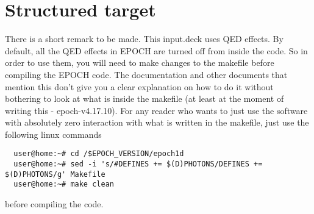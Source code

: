 \documentclass[12pt, class=report, crop=false]{standalone}
\begin{document}
\section*{Structured target}
There is a short remark to be made. This input.deck uses QED effects. By default, all the QED effects in EPOCH are turned off from inside the code. So in order to use them, you will need to make changes to the makefile before compiling the EPOCH code. The documentation and other documents that mention this don't give you a clear explanation on how to do it without bothering to look at what is inside the makefile (at least at the moment of writing this - epoch-v4.17.10). For any reader who wants to just use the software with absolutely zero interaction with what is written in the makefile, just use the following linux commands
\begin{verbatim}
  user@home:~# cd /$EPOCH_VERSION/epoch1d
  user@home:~# sed -i 's/#DEFINES += $(D)PHOTONS/DEFINES += $(D)PHOTONS/g' Makefile
  user@home:~# make clean
\end{verbatim}
before compiling the code.
\end{document}
